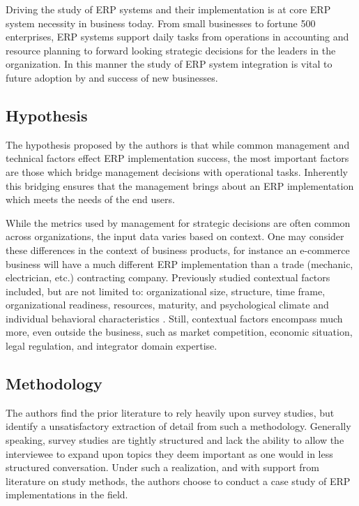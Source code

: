 \documentclass{article}
\begin{document}
Driving the study of ERP systems and their implementation is at core ERP system necessity in business today. 
From small businesses to fortune 500 enterprises, ERP systems support daily tasks from operations in accounting and resource planning to forward looking strategic decisions for the leaders in the organization. 
In this manner the study of ERP system integration is vital to future adoption by and success of new businesses. 

\subsection{Hypothesis}
The hypothesis proposed by the authors is that while common management and technical factors effect ERP implementation success, the most important factors are those which bridge management decisions with operational tasks. 
Inherently this bridging ensures that the management brings about an ERP implementation which meets the needs of the end users. 

While the metrics used by management for strategic decisions are often common across organizations, the input data varies based on context. 
One may consider these differences in the context of business products, for instance an e-commerce business will have a much different ERP implementation than a trade (mechanic, electrician, etc.) contracting company. 
Previously studied contextual factors included, but are not limited to: organizational size, structure, time frame, organizational readiness, resources, maturity, and psychological climate and individual behavioral characteristics \cite{integrated_erp}.
Still, contextual factors encompass much more, even outside the business, such as market competition, economic situation, legal regulation, and integrator domain expertise. 

\subsection{Methodology}
The authors find the prior literature to rely heavily upon survey studies, but identify a unsatisfactory extraction of detail from such a methodology. 
Generally speaking, survey studies are tightly structured and lack the ability to allow the interviewee to expand upon topics they deem important as one would in less structured conversation. 
Under such a realization, and with support from literature on study methods, the authors choose to conduct a case study of ERP implementations in the field. 
\end{document}
